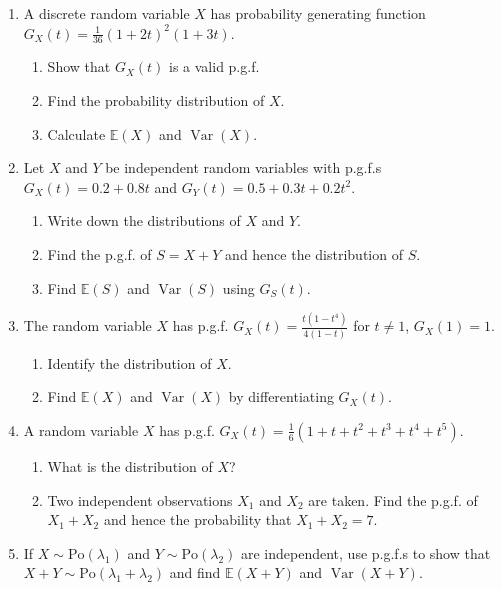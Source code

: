 \documentclass[11pt]{article}
\newcounter{popsec}
\newcounter{popsub}
\newcommand{\courssub}[1]{%
  \stepcounter{popsub}%
  \par\vspace{9pt}\noindent{\popxbold\fontsize{11.5}{13}\selectfont\color{popink}{\color{poporange}\thepopsec.\thepopsub}\hspace{6pt}#1}\par\nopagebreak\vspace{4pt}
}
\begin{document}
\courssub{Exercises}

\begin{exercice}
\begin{enumerate}
\item A discrete random variable $X$ has probability generating function $G_X(t) = \frac{1}{36}(1+2t)^2(1+3t)$. 
      \begin{enumerate}
      \item Show that $G_X(t)$ is a valid p.g.f.
      \item Find the probability distribution of $X$.
      \item Calculate $\mathbb{E}(X)$ and $\operatorname{Var}(X)$.
      \end{enumerate}
\item Let $X$ and $Y$ be independent random variables with p.g.f.s $G_X(t)=0.2+0.8t$ and $G_Y(t)=0.5+0.3t+0.2t^2$.
      \begin{enumerate}
      \item Write down the distributions of $X$ and $Y$.
      \item Find the p.g.f. of $S=X+Y$ and hence the distribution of $S$.
      \item Find $\mathbb{E}(S)$ and $\operatorname{Var}(S)$ using $G_S(t)$.
      \end{enumerate}
\item The random variable $X$ has p.g.f. $G_X(t) = \frac{t(1-t^4)}{4(1-t)}$ for $t\ne 1$, $G_X(1)=1$.
      \begin{enumerate}
      \item Identify the distribution of $X$.
      \item Find $\mathbb{E}(X)$ and $\operatorname{Var}(X)$ by differentiating $G_X(t)$.
      \end{enumerate}
\item A random variable $X$ has p.g.f. $G_X(t) = \frac{1}{6}(1+t+t^2+t^3+t^4+t^5)$. 
      \begin{enumerate}
      \item What is the distribution of $X$?
      \item Two independent observations $X_1$ and $X_2$ are taken. Find the p.g.f. of $X_1+X_2$ and hence the probability that $X_1+X_2 = 7$.
      \end{enumerate}
\item If $X \sim \mathrm{Po}(\lambda_1)$ and $Y \sim \mathrm{Po}(\lambda_2)$ are independent, use p.g.f.s to show that $X+Y \sim \mathrm{Po}(\lambda_1+\lambda_2)$ and find $\mathbb{E}(X+Y)$ and $\operatorname{Var}(X+Y)$.
\end{enumerate}
\end{exercice}
\end{document}
